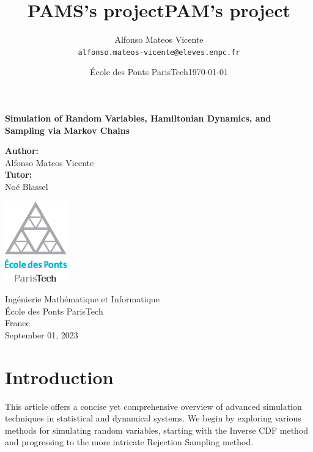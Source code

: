 \documentclass{article}
\title{PAMS's project} %
\author{Alfonso Mateos Vicente\\ \texttt{alfonso.mateos-vicente@eleves.enpc.fr}} %
\date{École des Ponts ParisTech} %
\title{PAM's project}
\date{\today}
\begin{document}
\begin{titlepage}
    \begin{center}
        \vspace*{1cm}
        
        \Huge
        \textbf{Simulation of Random Variables, Hamiltonian Dynamics, and Sampling via Markov Chains}
        
        \vspace{1.5cm}

        \Large
        \textbf{Author:} \\
        \vspace{0.25cm}
        \LARGE
        Alfonso Mateos Vicente \\
        \vspace{0.5cm}
        \Large
        \textbf{Tutor:} \\
        \vspace{0.25cm}
        \LARGE
        Noé Blassel

        \vfill
        
        \includegraphics[width=0.2\textwidth]{./logo-enpc.eps}
        
        \vspace{1cm}
        
        \normalsize
        Ingénierie Mathématique et Informatique \\
        École des Ponts ParisTech \\
        France \\
        September 01, 2023
    \end{center}
    \restoregeometry
\end{titlepage}


\newpage
\tableofcontents
\newpage

\section*{Introduction}

This article offers a concise yet comprehensive overview of advanced simulation techniques in statistical and dynamical systems. We begin by exploring various methods for simulating random variables, starting with the Inverse CDF method and progressing to the more intricate Rejection Sampling method.
\end{document}
